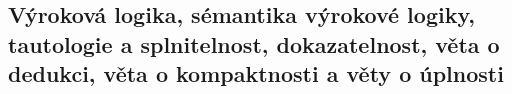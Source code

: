 \subsection{Výroková logika, sémantika výrokové logiky, tautologie a splnitelnost, dokazatelnost, věta o dedukci, věta o kompaktnosti a věty o úplnosti}